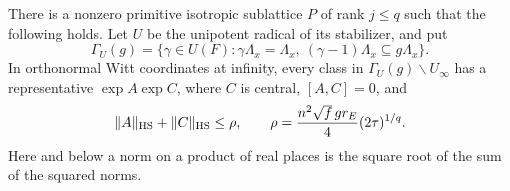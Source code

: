 \begin{lemma}\label{dc-radical-domain}
There is a nonzero primitive isotropic sublattice \(P\)
of rank \(j\le q\) such that the following holds.
Let \(U\) be the unipotent radical of its stabilizer,
and put
\[
 \Gamma_U(g)=
 \{\gamma\in U(F):\gamma\Lambda_x=\Lambda_x,\
                         (\gamma-1)\Lambda_x\subseteq g\Lambda_x\}.
\]
In orthonormal Witt coordinates at infinity, every
class in \(\Gamma_U(g)\backslash U_\infty\) has a
representative \(\exp A\exp C\), where \(C\) is central,
\([A,C]=0\), and
\begin{equation}\label{dc-radius}
 \|A\|_{\rm HS}+\|C\|_{\rm HS}\le\rho,\qquad
 \rho=\frac{n^2\sqrt f\,g r_E}{4}(2\tau)^{1/q}.
\end{equation}
Here and below a norm on a product of real places is
the square root of the sum of the squared norms.
\end{lemma}
